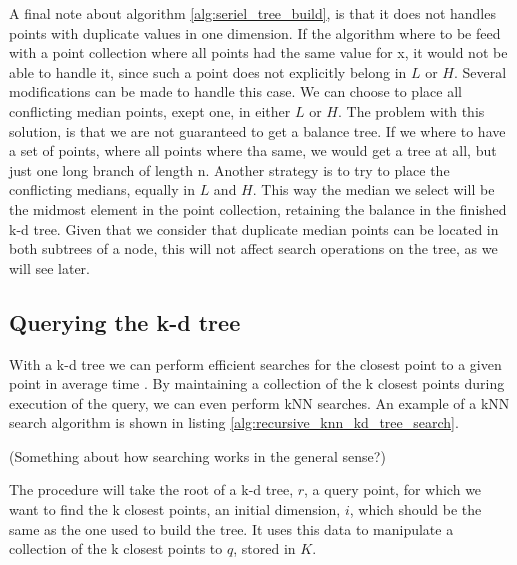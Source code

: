 A final note about algorithm \ref{alg:seriel_tree_build}, is that it does not handles points with duplicate values in one dimension. If the algorithm where to be feed with a point collection where all points had the same value for x, it would not be able to handle it, since such a point does not explicitly belong in $L$ or $H$. Several modifications can be made to handle this case. We can choose to place all conflicting median points, exept one, in either $L$ or $H$. The problem with this solution, is that we are not guaranteed to get a balance tree. If we where to have a set of points, where all points where tha same, we would get a tree at all, but just one long branch of length n. Another strategy is to try to place the conflicting medians, equally in $L$ and $H$. This way the median we select will be the midmost element in the point collection, retaining the balance in the finished k-d tree. Given that we consider that duplicate median points can be located in both subtrees of a node, this will not affect search operations on the tree, as we will see later.


\subsection{Querying the k-d tree} %
\label{sub:querying_the_k_d_tree}

With a k-d tree we can perform efficient searches for the closest point to a given point in  average time \cite{Friedman:1977}. By maintaining a collection of the k closest points during execution of the query, we can even perform kNN searches. An example of a kNN search algorithm is shown in listing \ref{alg:recursive_knn_kd_tree_search}.

(Something about how searching works in the general sense?)

The procedure will take the root of a k-d tree, $r$, a query point, for which we want to find the k closest points, an initial dimension, $i$, which should be the same as the one used to build the tree. It uses this data to manipulate a collection of the k closest points to $q$, stored in $K$.

